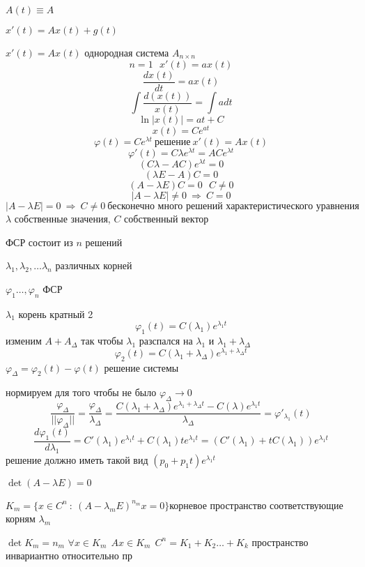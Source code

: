 \begin{define}
  $A(t) \equiv A$

  $x'(t) = Ax(t) + g(t)$

  $x'(t) = Ax(t)$ однородная система $A_{n\times n}$
  $$
  n=1 ~~~ x'(t) = ax(t)
  $$
  $$
  \frac{dx(t)}{dt} = ax(t)
  $$
  $$
  \int \frac{d(x(t))}{x(t)} = \int a dt
  $$
  $$
  \ln |x(t)| = at + C
  $$
  $$
  x(t) = Ce^{at}
  $$
  $$
  \varphi(t) = Ce^{\lambda t} ~ \text{решение} ~ x'(t) = Ax(t)
  $$
  $$
  \varphi'(t) = C \lambda e^{\lambda t} = ACe^{\lambda t}
  $$
  $$
  (C\lambda - AC)e^{\lambda t} = 0
  $$
  $$
  (\lambda E - A)C = 0
  $$
  $$
  (A - \lambda E)C = 0 ~~~ C \not= 0
  $$
  $$
  |A - \lambda E| \not= 0 ~ \Rightarrow ~ C = 0
  $$
  $$
  |A - \lambda E| = 0 ~ \Rightarrow ~ C \not= 0 ~ \text{бесконечно много
  решений характеристического уравнения}
  $$
  $\lambda$ собственные значения, $C$ собственный вектор

  ФСР состоит из $n$ решений

  $\lambda_1, \lambda_2, \ldots \lambda_n$ различных корней

  $\varphi_1 \ldots, \varphi_n$ ФСР

  $\lambda_1$ корень кратный 2
  $$
  \varphi_1(t) = C(\lambda_1) e^{\lambda_1 t}
  $$
  изменим $A + A_{\Delta}$ так чтобы $\lambda_1$ разспался на $\lambda_1$ и
  $\lambda_1 + \lambda_{\Delta}$
  $$
  \varphi_2(t) = C(\lambda_1 + \lambda_{\Delta})e^{\lambda_1 +
  \lambda_{\Delta}t}
  $$
  $\varphi_{\Delta} = \varphi_2(t) - \varphi(t)$ решение системы

  нормируем для того чтобы не было $\varphi_{\Delta} \to 0$
  $$
  \frac{\varphi_{\Delta}}{||\varphi_{\Delta}||} =
  \frac{\varphi_{\Delta}}{\lambda_{\Delta}} =
  \frac{C(\lambda_1 + \lambda_{\Delta})e^{\lambda_1 + \lambda_{\Delta}t} -
  C(\lambda)e^{\lambda_1 t}}{\lambda_{\Delta}} = \varphi'_{\lambda_1}(t)
  $$
  $$
  \frac{d \varphi_1(t)}{d\lambda_1} = C'(\lambda_1)e^{\lambda_1 t} +
  C(\lambda_1)t e^{\lambda_1 t} = (C'(\lambda_1) + t C(\lambda_1))
  e^{\lambda_1 t}
  $$
  решение должно иметь такой вид $(p_0 + p_1 t) e^{\lambda_1 t}$

  $\det(A - \lambda E) = 0$

  $K_m = \{x \in C^n ~ : ~ (A - \lambda_m E)^{n_m} x = 0\}$корневое
  пространство соответствующие корням $\lambda_m$

  $\det K_m = n_m$ $\forall x \in K_m ~~ Ax \in K_m ~~ C^n = K_1 + K_2 \ldots
  + K_k$ пространство инвариантно относительно пр
\end{define}

